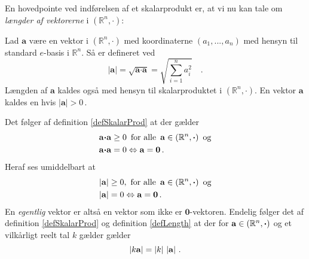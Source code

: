 En hovedpointe ved indførelsen af et skalarprodukt er, at vi nu kan tale om {\emph{længder af vektorerne}} i $(\mathbb{R}^{n}, \bm{\cdot})$:

\begin{definition} \label{defLength}
Lad $\mathbf{a}$ være en vektor i $(\mathbb{R}^{n}, \bm{\cdot})$ med koordinaterne $(a_{1}, . . . , a_{n})$ med hensyn til standard $e$-basis i $\mathbb{R}^{n}$. Så er  defineret ved
\begin{equation}
\vert \mathbf{a} \vert = \sqrt{\mathbf{a} \bm{\cdot} \mathbf{a}} = \sqrt{\sum_{i=1}^{n}a_{i}^{2}} \quad.
\end{equation}
Længden af $\mathbf{a}$ kaldes også  med hensyn til skalarproduktet i $(\mathbb{R}^{n}, \bm{\cdot})$.
En vektor $\mathbf{a}$ kaldes en  hvis $\vert \mathbf{a} \vert > 0\,$.
\end{definition}

\begin{aha}
Det følger af definition \ref{defSkalarProd} at der gælder
\begin{equation}\label{0regel1}
\begin{aligned}
\mathbf{a} {\bm{\cdot}}\mathbf{a} &\geq 0\,\,\,\textrm{for alle}\,\,\,\mathbf{a} \in (\mathbb{R}^{n}, \bm{\cdot})\,\,\,\mathrm{og}\\
\mathbf{a} {\bm{\cdot}}\mathbf{a} &= 0\Leftrightarrow \mathbf{a}=\bm{0}\,.
\end{aligned}
\end{equation}
Heraf ses umiddelbart at
\begin{equation}\label{0regel2}
\begin{aligned}
\left|\mathbf{a}\right| &\geq 0 ,\,\,\textrm{for alle}\,\,\,\mathbf{a} \in (\mathbb{R}^{n}, \bm{\cdot})\,\,\,\mathrm{og}\\
\left|\mathbf{a}\right|&= 0 \Leftrightarrow \mathbf{a}=\bm{0}\,.
\end{aligned}
\end{equation}
En \textit{egentlig} vektor er altså en vektor som ikke er $\mathbf 0$-vektoren. \bs
Endelig følger det af definition \ref{defSkalarProd} og definition \ref{defLength} at der for $\mathbf{a} \in (\mathbb{R}^{n}, \bm{\cdot})$ og et vilkårligt reelt tal $k$ gælder  gælder
\begin{equation}\label{kUdenfor}
\left|k\mathbf{a}\right|=\left|k\right|\,\left|\mathbf{a}\right|\,.
\end{equation}
\end{aha}

